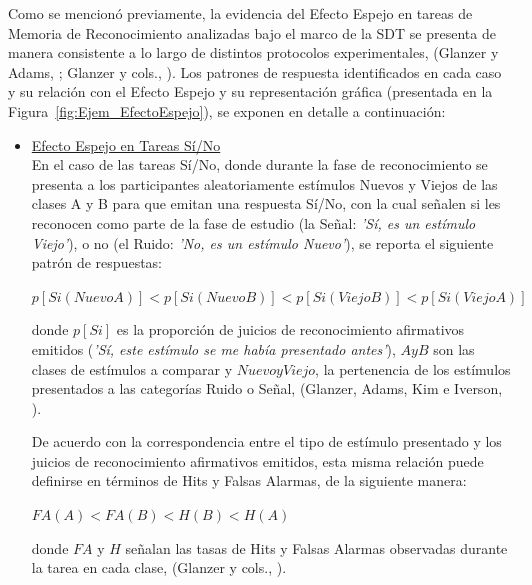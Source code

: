Como se mencionó previamente, la evidencia del Efecto Espejo en tareas de Memoria de Reconocimiento analizadas bajo el marco de la SDT se presenta de manera consistente a lo largo de distintos protocolos experimentales, (Glanzer y Adams, \citeyear{Glanzer1990}; Glanzer y cols., \citeyear{Glanzer1993}). Los patrones de respuesta identificados en cada caso y su relación con el Efecto Espejo y su representación gráfica (presentada en la Figura~\ref{fig:Ejem_EfectoEspejo}), se exponen en detalle a continuación:\\

\begin{itemize}
\item \underline{Efecto Espejo en Tareas Sí/No}\\

En el caso de las tareas Sí/No, donde durante la fase de reconocimiento se presenta a los participantes aleatoriamente estímulos Nuevos y Viejos de las clases A y B para que emitan una respuesta Sí/No, con la cual señalen si les reconocen como parte de la fase de estudio (la Señal: \textit{'Sí, es un estímulo Viejo'}), o no (el Ruido: \textit{'No, es un estímulo Nuevo'}), se reporta el siguiente patrón de respuestas:\\

\begin{center}
$p[Si(NuevoA)] < p[Si(NuevoB)] < p[Si(ViejoB)] < p[Si(ViejoA)]$\\
\end{center}
\begin{center}
donde $p[Si]$ es la proporción de juicios de reconocimiento afirmativos emitidos (\textit{'Sí, este estímulo se me había presentado antes'}), $A y B$ son las clases de estímulos a comparar y $Nuevo y Viejo$, la pertenencia de los estímulos presentados a las categorías Ruido o Señal, (Glanzer, Adams, Kim e Iverson, \citeyear{Glanzer1993}).\\
\end{center}

De acuerdo con la correspondencia entre el tipo de estímulo presentado y los juicios de reconocimiento afirmativos emitidos, esta misma relación puede definirse en términos de Hits y Falsas Alarmas, de la siguiente manera:\\

\begin{center}
$FA(A) < FA(B) < H(B) < H(A)$\\
\end{center}
\begin{center}
donde $FA$ y $H$ señalan las tasas de Hits y Falsas Alarmas observadas durante la tarea en cada clase, (Glanzer y cols., \citeyear{Glanzer1993}).\\
\end{center}


\end{itemize}
